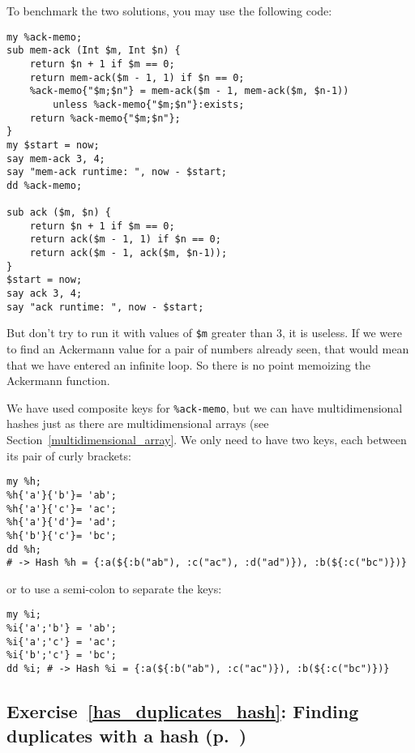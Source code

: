 To benchmark the two solutions, you may use the following 
code:

\begin{verbatim}
my %ack-memo;
sub mem-ack (Int $m, Int $n) {
    return $n + 1 if $m == 0;
    return mem-ack($m - 1, 1) if $n == 0;
    %ack-memo{"$m;$n"} = mem-ack($m - 1, mem-ack($m, $n-1)) 
        unless %ack-memo{"$m;$n"}:exists;
    return %ack-memo{"$m;$n"};
}
my $start = now;
say mem-ack 3, 4;
say "mem-ack runtime: ", now - $start;
dd %ack-memo;

sub ack ($m, $n) {
    return $n + 1 if $m == 0;
    return ack($m - 1, 1) if $n == 0;
    return ack($m - 1, ack($m, $n-1));
}
$start = now;
say ack 3, 4;
say "ack runtime: ", now - $start;
\end{verbatim}

But don't try to run it with values of \verb'$m' greater 
than 3, it is useless. If we were to find an Ackermann 
value for a pair of numbers already seen, that would 
mean that we have entered an infinite loop. So there is 
no point memoizing the Ackermann function.

We have used composite keys for \verb'%ack-memo', but we 
can have multidimensional hashes just as there are 
multidimensional arrays (see Section~\ref{multidimensional_array}. 
We only need to have two keys, each between its pair of 
curly brackets:
\begin{verbatim}
my %h;
%h{'a'}{'b'}= 'ab';
%h{'a'}{'c'}= 'ac';
%h{'a'}{'d'}= 'ad';
%h{'b'}{'c'}= 'bc';
dd %h; 
# -> Hash %h = {:a(${:b("ab"), :c("ac"), :d("ad")}), :b(${:c("bc")})}
\end{verbatim}
%

or to use a semi-colon to separate the keys:

\begin{verbatim}
my %i;
%i{'a';'b'} = 'ab';
%i{'a';'c'} = 'ac';
%i{'b';'c'} = 'bc';
dd %i; # -> Hash %i = {:a(${:b("ab"), :c("ac")}), :b(${:c("bc")})}
\end{verbatim}
%

\subsection{Exercise~\ref{has_duplicates_hash}: Finding duplicates with a hash (p.~\pageref{has_duplicates_hash})}
\label{sol_has_duplicates_hash}


